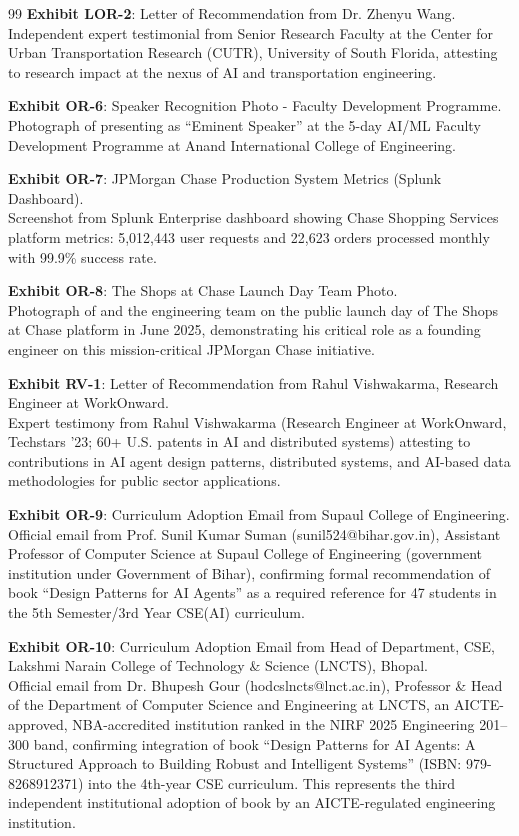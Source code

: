 \documentclass[11pt]{article}
\begin{document}
\begin{thebibliography}{99}
\textbf{Exhibit LOR-2}: Letter of Recommendation from Dr. Zhenyu Wang.
\\Independent expert testimonial from Senior Research Faculty at the Center for Urban Transportation Research (CUTR), University of South Florida, attesting to \drs research impact at the nexus of AI and transportation engineering.


\textbf{Exhibit OR-6}: Speaker Recognition Photo - Faculty Development Programme.
\\Photograph of \dr presenting as ``Eminent Speaker'' at the 5-day AI/ML Faculty Development Programme at Anand International College of Engineering.

\textbf{Exhibit OR-7}: JPMorgan Chase Production System Metrics (Splunk Dashboard).
\\Screenshot from Splunk Enterprise dashboard showing \drs Chase Shopping Services platform metrics: 5,012,443 user requests and 22,623 orders processed monthly with 99.9\% success rate.

\textbf{Exhibit OR-8}: The Shops at Chase Launch Day Team Photo.
\\Photograph of \dr and the engineering team on the public launch day of The Shops at Chase platform in June 2025, demonstrating his critical role as a founding engineer on this mission-critical JPMorgan Chase initiative.

\textbf{Exhibit RV-1}: Letter of Recommendation from Rahul Vishwakarma, Research Engineer at WorkOnward.
\\Expert testimony from Rahul Vishwakarma (Research Engineer at WorkOnward, Techstars '23; 60+ U.S. patents in AI and distributed systems) attesting to \drs contributions in AI agent design patterns, distributed systems, and AI-based data methodologies for public sector applications.

\textbf{Exhibit OR-9}: Curriculum Adoption Email from Supaul College of Engineering.
\\Official email from Prof. Sunil Kumar Suman (sunil524@bihar.gov.in), Assistant Professor of Computer Science at Supaul College of Engineering (government institution under Government of Bihar), confirming formal recommendation of \drs book ``Design Patterns for AI Agents'' as a required reference for 47 students in the 5th Semester/3rd Year CSE(AI) curriculum.

\textbf{Exhibit OR-10}: Curriculum Adoption Email from Head of Department, CSE, Lakshmi Narain College of Technology \& Science (LNCTS), Bhopal.
\\Official email from Dr. Bhupesh Gour (hodcslncts@lnct.ac.in), Professor \& Head of the Department of Computer Science and Engineering at LNCTS, an AICTE-approved, NBA-accredited institution ranked in the NIRF 2025 Engineering 201--300 band, confirming integration of \drs book ``Design Patterns for AI Agents: A Structured Approach to Building Robust and Intelligent Systems'' (ISBN: 979-8268912371) into the 4th-year CSE curriculum. This represents the third independent institutional adoption of \drs book by an AICTE-regulated engineering institution.


\end{thebibliography}
\end{document}
